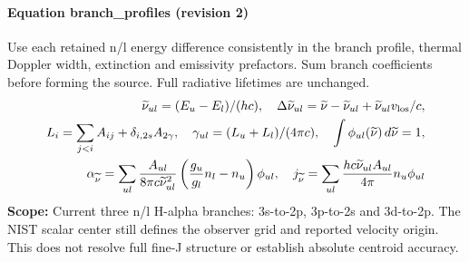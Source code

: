 
\paragraph{Equation branch\_profiles (revision 2)}
Use each retained n/l energy difference consistently in the branch profile, thermal Doppler width, extinction and emissivity prefactors. Sum branch coefficients before forming the source. Full radiative lifetimes are unchanged.
\begin{equation}
\begin{aligned}
\widetilde\nu_{ul}=(E_u-E_l)/(hc),\quad \Delta\widetilde\nu_{ul}=\widetilde\nu-\widetilde\nu_{ul}+\widetilde\nu_{ul}v_{\rm los}/c,\\L_i=\sum_{j<i}A_{ij}+\delta_{i,2s}A_{2\gamma},\quad \gamma_{ul}=(L_u+L_l)/(4\pi c),\quad \int\phi_{ul}(\widetilde\nu)\,d\widetilde\nu=1,\\\alpha_{\widetilde\nu}=\sum_{ul}\frac{A_{ul}}{8\pi c\widetilde\nu_{ul}^2}\left(\frac{g_u}{g_l}n_l-n_u\right)\phi_{ul},\quad j_{\widetilde\nu}=\sum_{ul}\frac{hc\widetilde\nu_{ul}A_{ul}}{4\pi}n_u\phi_{ul}
\end{aligned}
\label{eq:escape.nlte_5f_spectrum:branch_5f_profiles:2}
\end{equation}
\noindent\textbf{Scope:} Current three n/l H-alpha branches: 3s-to-2p, 3p-to-2s and 3d-to-2p. The NIST scalar center still defines the observer grid and reported velocity origin. This does not resolve full fine-J structure or establish absolute centroid accuracy.

